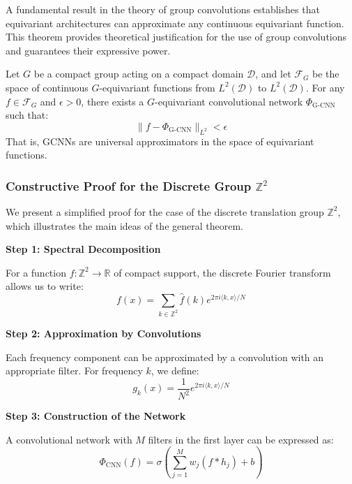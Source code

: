 A fundamental result in the theory of group convolutions establishes that equivariant architectures can approximate any continuous equivariant function. This theorem provides theoretical justification for the use of group convolutions and guarantees their expressive power.

\begin{theorem}\label{theorem:equivariant_universality_cnns}
    Let $G$ be a compact group acting on a compact domain $\mathcal{D}$, and let $\mathcal{F}_G$ be the space of continuous $G$-equivariant functions from $L^2(\mathcal{D})$ to $L^2(\mathcal{D})$. For any $f \in \mathcal{F}_G$ and $\epsilon > 0$, there exists a $G$-equivariant convolutional network $\Phi_{\text{G-CNN}}$ such that:
    \begin{equation}
        \|f - \Phi_{\text{G-CNN}}\|_{L^2} < \epsilon
    \end{equation}
    That is, \glspl{GCNN} are universal approximators in the space of equivariant functions.
\end{theorem}

\subsubsection{Constructive Proof for the Discrete Group $\mathbb{Z}^2$}

We present a simplified proof for the case of the discrete translation group $\mathbb{Z}^2$, which illustrates the main ideas of the general theorem.

\textbf{Step 1: Spectral Decomposition}

For a function $f: \mathbb{Z}^2 \to \mathbb{R}$ of compact support, the discrete Fourier transform allows us to write:
\begin{equation}
    f(x) = \sum_{k \in \mathbb{Z}^2} \hat{f}(k) e^{2\pi i \langle k, x \rangle / N}
\end{equation}

\textbf{Step 2: Approximation by Convolutions}

Each frequency component can be approximated by a convolution with an appropriate filter. For frequency $k$, we define:
\begin{equation}
    g_k(x) = \frac{1}{N^2} e^{2\pi i \langle k, x \rangle / N}
\end{equation}

\textbf{Step 3: Construction of the Network}

A convolutional network with $M$ filters in the first layer can be expressed as:
\begin{equation}
    \Phi_{\text{CNN}}(f) = \sigma\left(\sum_{j=1}^M w_j (f * h_j) + b\right)
\end{equation}


